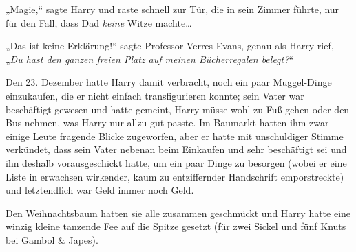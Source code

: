 „Magie,“ sagte Harry und raste schnell zur Tür, die in sein Zimmer führte, nur für den Fall, dass Dad \emph{keine} Witze machte…

„Das ist keine Erklärung!“ sagte Professor Verres-Evans, genau als Harry rief, „\emph{Du hast den ganzen freien Platz auf meinen Bücherregalen belegt?}“

\later

Den 23. Dezember hatte Harry damit verbracht, noch ein paar Muggel-Dinge einzukaufen, die er nicht einfach transfigurieren konnte; sein Vater war beschäftigt gewesen und hatte gemeint, Harry müsse wohl zu Fuß gehen oder den Bus nehmen, was Harry nur allzu gut passte. Im Baumarkt hatten ihm zwar einige Leute fragende Blicke zugeworfen, aber er hatte mit unschuldiger Stimme verkündet, dass sein Vater nebenan beim Einkaufen und sehr beschäftigt sei und ihn deshalb vorausgeschickt hatte, um ein paar Dinge zu besorgen (wobei er eine Liste in erwachsen wirkender, kaum zu entziffernder Handschrift emporstreckte) und letztendlich war Geld immer noch Geld.

Den Weihnachtsbaum hatten sie alle zusammen geschmückt und Harry hatte eine winzig kleine tanzende Fee auf die Spitze gesetzt (für zwei Sickel und fünf Knuts bei Gambol \& Japes).

